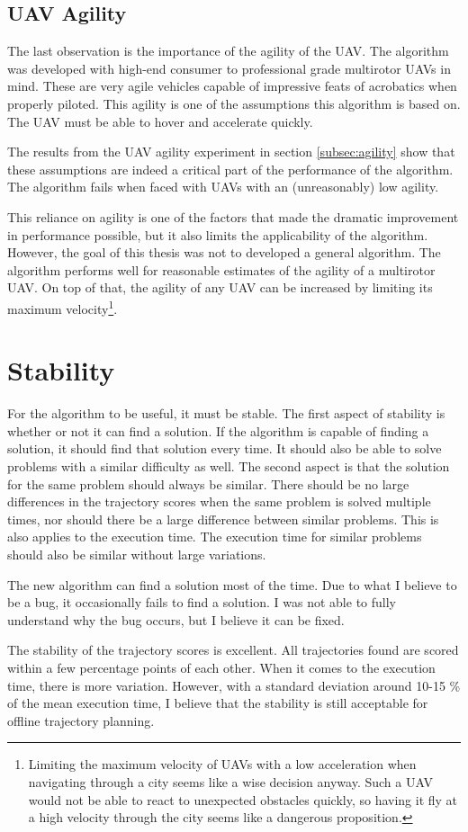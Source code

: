 \subsection{UAV Agility} 
The last observation is the importance of the agility of the UAV. The algorithm was developed with high-end consumer to professional grade multirotor UAVs in mind. These are very agile vehicles capable of impressive feats of acrobatics when properly piloted. This agility is one of the assumptions this algorithm is based on. The UAV must be able to hover and accelerate quickly.
\par
The results from the UAV agility experiment in section \ref{subsec:agility} show that these assumptions are indeed a critical part of the performance of the algorithm. The algorithm fails when faced with UAVs with an (unreasonably) low agility. 
\par
This reliance on agility is one of the factors that made the dramatic improvement in performance possible, but it also limits the applicability of the algorithm. However, the goal of this thesis was not to developed a general algorithm. The algorithm performs well for reasonable estimates of the agility of a multirotor UAV. On top of that, the agility of any UAV can be increased by limiting its maximum velocity\footnote{Limiting the maximum velocity of UAVs with a low acceleration when navigating through a city seems like a wise decision anyway. Such a UAV would not be able to react to unexpected obstacles quickly, so having it fly at a high velocity through the city seems like a dangerous proposition.}.


\section{Stability}
\label{subsec:disc-stab}
For the algorithm to be useful, it must be stable. The first aspect of stability is whether or not it can find a solution. If the algorithm is capable of finding a solution, it should find that solution every time. It should also be able to solve problems with a similar difficulty as well. The second aspect is that the solution for the same problem should always be similar. There should be no large differences in the trajectory scores when the same problem is solved multiple times, nor should there be a large difference between similar problems. This is also applies to the execution time. The execution time for similar problems should also be similar without large variations.
\par
The new algorithm can find a solution most of the time. Due to what I believe to be a bug, it occasionally fails to find a solution. I was not able to fully understand why the bug occurs, but I believe it can be fixed.  
\par
The stability of the trajectory scores is excellent. All trajectories found are scored within a few percentage points of each other. When it comes to the execution time, there is more variation. However, with a standard deviation around 10-15 \% of the mean execution time, I believe that the stability is still acceptable for offline trajectory planning.

